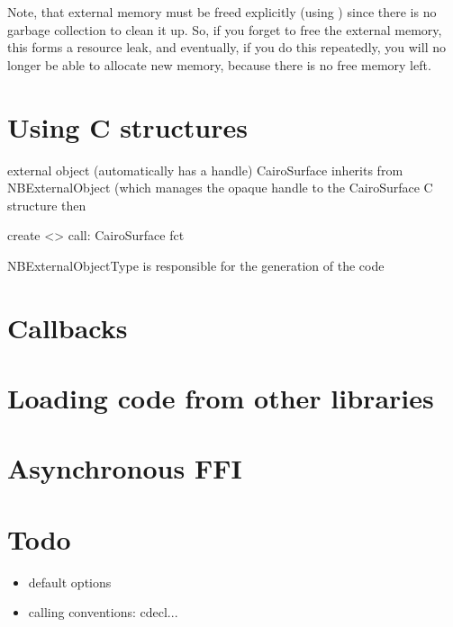 \documentclass[a4paper,10pt,twoside]{book}
\begin{document}
Note, that external memory must be freed explicitly (using ) since there is no garbage collection to clean it up.
So, if you forget to free the external memory, this forms a resource leak, and eventually, if you do this repeatedly, you will no longer be able to allocate new memory, because there is no free memory left.







\section{Using C structures}

external object (automatically has a handle)
CairoSurface inherits from NBExternalObject (which manages the opaque handle to the CairoSurface C structure then 

\begin{code}{}
create  
	<>
	call: CairoSurface	fct 
\end{code}	

NBExternalObjectType is responsible for the generation of the code


\section{Callbacks}


\section{Loading code from other libraries}


\section{Asynchronous FFI}


\section{Todo}

\begin{itemize}
\item default options 
\item calling conventions: cdecl...
\end{itemize}
\end{document}

